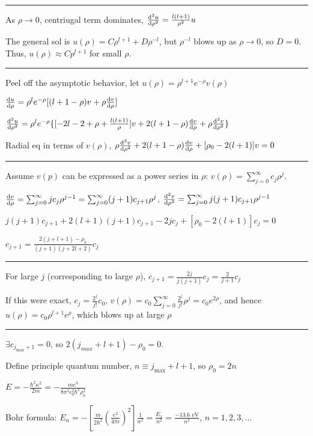\hrule height 0.1pt

As $\rho \rightarrow 0$, centriugal term dominates, $\dv[2]{u}{\rho} = \frac{l(l+1)}{\rho^2} u$

The general sol is $u(\rho) = C \rho^{l+1} + D \rho^{-l}$, but $\rho^{-l}$ blows up as $\rho \rightarrow 0$, so $D = 0$. Thus, $u(\rho) \approx C p^{l+1}$ for small $\rho$. 

\hrule height 0.1pt

Peel off the asymptotic behavior, let $u(\rho) = \rho^{l+1} e^{-\rho} v(\rho)$

$\dv{u}{\rho} = \rho^l e^{-\rho} [(l+1-\rho) v + \rho \dv{v}{\rho}]$

$\dv[2]{u}{\rho} = \rho^l e^{-\rho} \{[-2l - 2 + \rho + \frac{l(l+1)}{\rho}]v + 2(l + 1 - \rho) \dv{v}{\rho} + \rho \dv[2]{v}{\rho} \}$

Radial eq in terms of $v(\rho)$, $\rho \dv[2]{v}{\rho} + 2(l + 1 - \rho) \dv{v}{\rho} + [\rho_0 - 2(l+1)]v = 0$

\hrule height 0.1pt

Assume $v(p)$ can be expressed as a power series in $\rho$: $v(\rho) = \sum_{j=0}^{\infty} c_j \rho^j$.

$\dv{v}{\rho} = \sum_{j=0}^{\infty} j c_j \rho^{j-1} = \sum_{j=0}^{\infty} (j+1) c_{j+1} \rho^j$, $\dv[2]{v}{\rho} = \sum_{j=0}^{\infty} j(j+1) c_{j+1} \rho^{j-1}$

$j(j+1)c_{j+1} + 2(l+1)(j+1)c_{j+1} - 2jc_j + [\rho_0 - 2(l+1)]c_j = 0$

$c_{j+1} = \frac{2(j+l+1) - \rho_0}{(j+1)(j+2l+2)} c_j$

\hrule height 0.1pt

For large $j$ (corresponding to large $\rho$), $c_{j+1} = \frac{2j}{j(j+1)}c_j = \frac{2}{j+1}c_j$

If this were exact, $c_j = \frac{2^j}{j!} c_0$, $v(\rho) = c_0 \sum_{j=0}^{\infty} \frac{2^j}{j!} \rho^j = c_0 e^{2\rho}$, and hence $u(\rho) = c_0 \rho^{l+1} e^{\rho}$, which blows up at large $\rho$

\hrule height 0.1pt

$\exists c_{j_{\textrm{max}} + 1} = 0$, so $2(j_{max} + l + 1) - \rho_0 = 0$.

Define principle quantum number, $n \equiv j_{\textrm{max}} + l + 1$, so $\rho_0 = 2n$

$E = -\frac{\hbar^2 \kappa^2}{2m} = - \frac{me^3}{8 \pi^2 \epsilon_0^2 \hbar^2 \rho_0^2}$

Bohr formula: $E_n = - [\frac{m}{2 \hbar^2} (\frac{e^2}{4\pi\epsilon})^2] \frac{1}{n^2} = \frac{E_1}{n^2} = \frac{-13.6 \textrm{ eV}}{n^2}$, $n=1, 2, 3, ...$

